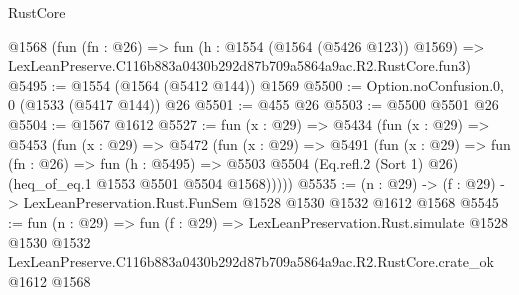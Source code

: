 \begin{lexlean}{RustCore}
\begin{coremodule}
    @1568
    (fun (fn : @26) =>
    fun (h : @1554 (@1564 (@5426 @123)) @1569) =>
    LexLeanPreserve.C116b883a0430b292d87b709a5864a9ac.R2.RustCore.fun3)
@5495 := @1554 (@1564 (@5412 @144)) @1569
@5500 := Option.noConfusion.{0, 0} (@1533 (@5417 @144)) @26
@5501 := @455 @26
@5503 := @5500 @5501 @26
@5504 := @1567 @1612
@5527 := fun (x : @29) =>
  @5434
    (fun (x : @29) =>
    @5453
      (fun (x : @29) =>
      @5472
        (fun (x : @29) =>
        @5491
          (fun (x : @29) =>
          fun (fn : @26) =>
          fun (h : @5495) =>
          @5503 @5504 (Eq.refl.{2} (Sort 1) @26) (heq_of_eq.{1} @1553 @5501 @5504 @1568)))))
@5535 := (n : @29) -> (f : @29) -> LexLeanPreservation.Rust.FunSem @1528 @1530 @1532 @1612 @1568
@5545 := fun (n : @29) =>
  fun (f : @29) =>
  LexLeanPreservation.Rust.simulate
    @1528
    @1530
    @1532
    LexLeanPreserve.C116b883a0430b292d87b709a5864a9ac.R2.RustCore.crate_ok
    @1612
    @1568
\end{coremodule}
\end{lexlean}
